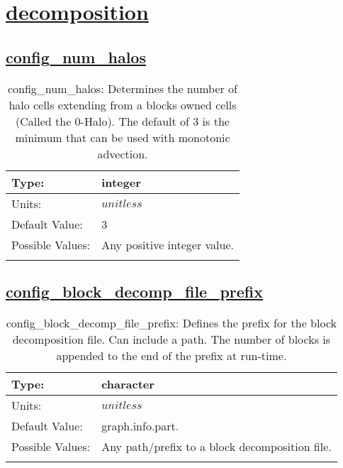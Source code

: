 \section[decomposition]{\hyperref[sec:nm_tab_decomposition]{decomposition}}
\label{sec:nm_sec_decomposition}
\subsection[config\_num\_halos]{\hyperref[sec:nm_tab_decomposition]{config\_num\_halos}}
\label{subsec:nm_sec_config_num_halos}
\begin{center}
\begin{longtable}{| p{2.0in} || p{4.0in} |}
    \hline
    Type: & integer \\
    \hline
    Units: & $unitless$ \\
    \hline
    Default Value: & 3 \\
    \hline
    Possible Values: & Any positive integer value. \\
    \hline
    \caption{config\_num\_halos: Determines the number of halo cells extending from a blocks owned cells (Called the 0-Halo). The default of 3 is the minimum that can be used with monotonic advection.}
\end{longtable}
\end{center}
\subsection[config\_block\_decomp\_file\_prefix]{\hyperref[sec:nm_tab_decomposition]{config\_block\_decomp\_file\_prefix}}
\label{subsec:nm_sec_config_block_decomp_file_prefix}
\begin{center}
\begin{longtable}{| p{2.0in} || p{4.0in} |}
    \hline
    Type: & character \\
    \hline
    Units: & $unitless$ \\
    \hline
    Default Value: & graph.info.part. \\
    \hline
    Possible Values: & Any path/prefix to a block decomposition file. \\
    \hline
    \caption{config\_block\_decomp\_file\_prefix: Defines the prefix for the block decomposition file. Can include a path. The number of blocks is appended to the end of the prefix at run-time.}
\end{longtable}
\end{center}
